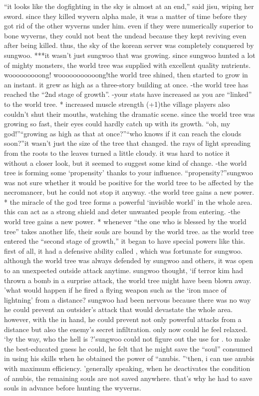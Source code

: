 “it looks like the dogfighting in the sky is almost at an end,” said jisu, wiping her sword.
since they killed wyvern alpha male, it was a matter of time before they got rid of the other wyverns under him.
 even if they were numerically superior to bone wyverns, they could not beat the undead because they kept reviving even after being killed.
thus, the sky of the korean server was completely conquered by sungwoo.
***it wasn’t just sungwoo that was growing.
since sungwoo hunted a lot of mighty monsters, the world tree was supplied with excellent quality nutrients.
wooooooooong! wooooooooooong!the world tree shined, then started to grow in an instant.
 it grew as high as a three-story building at once.
-the world tree has reached the “2nd stage of growth”.
-your stats have increased as you are “linked” to the world tree.
* increased muscle strength (+1)the village players also couldn’t shut their mouths, watching the dramatic scene.
 since the world tree was growing so fast, their eyes could hardly catch up with its growth.
“oh, my god!”“growing as high as that at once?”“who knows if it can reach the clouds soon?”it wasn’t just the size of the tree that changed.
 the rays of light spreading from the roots to the leaves turned a little cloudy.
it was hard to notice it without a closer look, but it seemed to suggest some kind of change.
-the world tree is forming some ‘propensity’ thanks to your influence.
“propensity?”sungwoo was not sure whether it would be positive for the world tree to be affected by the necromancer, but he could not stop it anyway.
-the world tree gains a new power.
 * the miracle of the god tree forms a powerful ‘invisible world’ in the whole area.
 this can act as a strong shield and deter unwanted people from entering.
-the world tree gains a new power.
 * whenever “the one who is blessed by the world tree” takes another life, their souls are bound by the world tree.
as the world tree entered the “second stage of growth,” it began to have special powers like this.
 first of all, it had a defensive ability called , which was fortunate for sungwoo.
although the world tree was always defended by sungwoo and others, it was open to an unexpected outside attack anytime.
sungwoo thought, ‘if terror kim had thrown a bomb in a surprise attack, the world tree might have been blown away.
’what would happen if he fired a flying weapon such as the ‘iron mace of lightning’ from a distance? sungwoo had been nervous because there was no way he could prevent an outsider’s attack that would devastate the whole area.
however, with the  in hand, he could prevent not only powerful attacks from a distance but also the enemy’s secret infiltration.
 only now could he feel relaxed.
‘by the way, who the hell is ?’sungwoo could not figure out the use for .
to make the best-educated guess he could, he felt that he might save the “soul” consumed in using his skills when he obtained the power of “anubis.
”‘then, i can use anubis with maximum efficiency.
’generally speaking, when he deactivates the condition of anubis, the remaining souls are not saved anywhere.
 that’s why he had to save souls in advance before hunting the wyverns.


